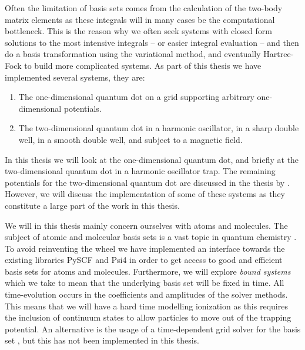     Often the limitation of basis sets comes from the calculation of the
    two-body matrix elements as these integrals will in many cases be the
    computational bottleneck.
    This is the reason why we often seek systems with closed form solutions to
    the most intensive integrals -- or easier integral evaluation -- and then do
    a basis transformation using the variational method, and eventually
    Hartree-Fock to build more complicated systems.
    As part of this thesis we have implemented several systems, they are:
    \begin{enumerate}
        \item The one-dimensional quantum dot on a grid supporting arbitrary
            one-dimensional potentials.
        \item The two-dimensional quantum dot in a harmonic oscillator, in a
            sharp double well, in a smooth double well, and subject to a
            magnetic field.
    \end{enumerate}
    In this thesis we will look at the one-dimensional quantum dot, and briefly
    at the two-dimensional quantum dot in a harmonic oscillator trap.
    The remaining potentials for the two-dimensional quantum dot are discussed
    in the thesis by \citeauthor{greg-winther} \cite{greg-winther}.
    However, we will discuss the implementation of some of these systems as they
    constitute a large part of the work in this thesis.

    We will in this thesis mainly concern ourselves with atoms and molecules.
    The subject of atomic and molecular basis sets is a vast topic in quantum
    chemistry \cite{helgaker-molecular}.
    To avoid reinventing the wheel we have implemented an interface towards the
    existing libraries PySCF \cite{pyscf} and Psi4 \cite{psi4} in order to get
    access to good and efficient basis sets for atoms and molecules.
    Furthermore, we will explore \emph{bound systems} which we take to mean that
    the underlying basis set will be fixed in time.
    All time-evolution occurs in the coefficients and amplitudes of the solver
    methods.
    This means that we will have a hard time modelling ionization as this
    requires the inclusion of continuum states to allow particles to move out of
    the trapping potential.
    An alternative is the usage of a time-dependent grid solver for the basis
    set \cite{miyagi_and_madsen}, but this has not been implemented in this
    thesis.


    

